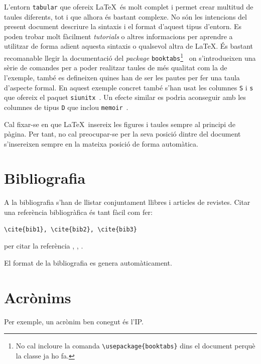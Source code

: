 L'entorn \texttt{tabular} que ofereix \LaTeX\  és molt complet i permet crear
multitud de taules diferents, tot i que alhora és bastant complexe. No són les
intencions del present document descriure la sintaxis i el format d'aquest
tipus d'entorn. Es poden trobar molt fàcilment \emph{tutorials} o altres informacions
per aprendre a utilitzar de forma adient aquesta sintaxis o qualsevol altra de
\LaTeX. És bastant recomanable llegir la documentació del \emph{package}
\texttt{booktabs}\footnote{No cal incloure la comanda  \texttt{\textbackslash usepackage\{booktabs\}} dins el document perquè la classe ja ho fa.}~\cite{Fea05} on s'introdueixen una sèrie de comandes per a poder realitzar
taules de més qualitat com la de l'exemple, també es defineixen quines han de
ser les pautes per fer una taula d'aspecte formal. En aquest exemple concret també s'han usat les columnes \texttt{S} i \texttt{s} que ofereix el paquet \texttt{siunitx}~\cite{Wri12}. Un efecte similar es podria aconseguir amb les columnes de tipus \texttt{D} que inclou \texttt{memoir}~\cite[Cap. 11]{Wil10}.

Cal fixar-se en que \LaTeX\ insereix les figures i taules sempre al principi de pàgina. Per tant, no cal preocupar-se per la seva posició
dintre del document s'insereixen sempre en la mateixa posició de forma automàtica.

\section{Bibliografia}

A la bibliografia s'han de llistar conjuntament llibres i articles de revistes.
Citar una referència bibliogràfica és tant fàcil com fer:
\begin{verbatim}
\cite{bib1}, \cite{bib2}, \cite{bib3}
\end{verbatim}
per citar la referència \cite{bib1}, \cite{bib2}, \cite{bib3}. 

El format de la bibliografia es genera automàticament.

\section{Acrònims}

Per exemple, un acrònim ben conegut és l'\ac{IP}.
